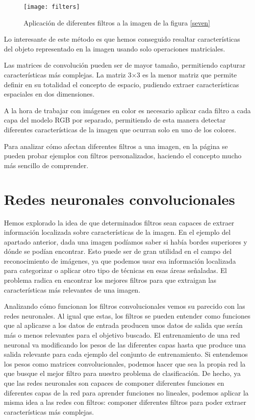 \begin{figure}
    \centering
    \caption{Aplicación de diferentes filtros a la imagen de la figura \ref{seven}}
  \label{filters}
  \texttt{[image: filters]}
\end{figure}

Lo interesante de este método es que hemos conseguido resaltar características
del objeto representado en la imagen usando solo operaciones matriciales.

Las matrices de convolución pueden ser de mayor tamaño, permitiendo capturar
características más complejas. La matriz 3$\times$3 es la menor matriz que
permite definir en su totalidad el concepto de espacio, pudiendo extraer
características espaciales en dos dimensiones.

A la hora de trabajar con imágenes en color es necesario aplicar cada filtro a
cada capa del modelo RGB por separado, permitiendo de esta manera detectar diferentes
características de la imagen que ocurran solo en uno de los colores.

Para analizar cómo afectan diferentes filtros a una imagen, en la página \parencite{visualizer_convolution} se pueden probar ejemplos con filtros personalizados, haciendo el concepto mucho más sencillo de comprender.

\section{Redes neuronales convolucionales}
\label{sec:conv-net}

Hemos explorado la idea de que determinados filtros sean capaces de extraer información localizada sobre características de la imagen. En el ejemplo del apartado anterior, dada una imagen podíamos saber si había bordes superiores y dónde se podían encontrar. Esto puede ser de gran utilidad en el campo del reconocimiento de imágenes, ya que podemos usar esa información localizada para categorizar o aplicar otro tipo de técnicas en esas áreas señaladas. El problema radica en encontrar los mejores filtros para que extraigan las características más relevantes de una imagen.

Analizando cómo funcionan los filtros convolucionales vemos su parecido con las redes neuronales. Al igual que estas, los filtros se pueden entender como funciones que al aplicarse a los datos de entrada producen unos datos de salida que serán más o menos relevantes para el objetivo buscado. El entrenamiento de una red neuronal va modificando los pesos de las diferentes capas hasta que produce una salida relevante para cada ejemplo del conjunto de entrenamiento. Si entendemos los pesos como matrices convolucionales, podemos hacer que sea la propia red la que busque el mejor filtro para nuestro problema de clasificación. De hecho, ya que las redes neuronales son capaces de componer diferentes funciones en diferentes capas de la red para aprender funciones no lineales, podemos aplicar la misma idea a las redes con filtros: componer diferentes filtros para poder extraer características más complejas.

